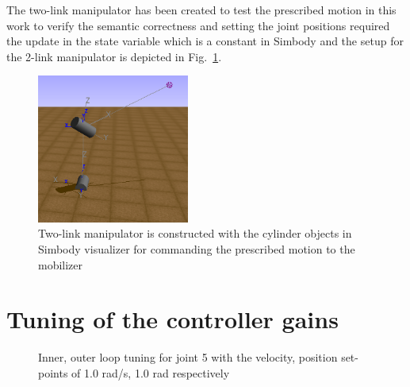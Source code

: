 The two-link manipulator has been created to test the prescribed motion in this work to verify the semantic correctness and setting the joint positions required the update in the state variable which is a constant in Simbody and the setup for the 2-link manipulator is depicted in Fig.~\ref{fig:simbody_2link}.

\begin{figure}[H]
\centering
\includegraphics[width=50mm, trim=0 0 0 0]{pictures/simbody_2link_manipulator}
\caption{Two-link manipulator is constructed with the cylinder objects in Simbody visualizer for commanding the prescribed motion to the mobilizer}
\label{fig:simbody_2link}
\end{figure}

\chapter{Tuning of the controller gains}
\label{sec:appendixD}

\begin{figure}[H]
\centering     %
{}
\caption{Inner, outer loop tuning for joint 5 with the velocity, position set-points of 1.0 rad/s, 1.0 rad respectively}
\end{figure}

